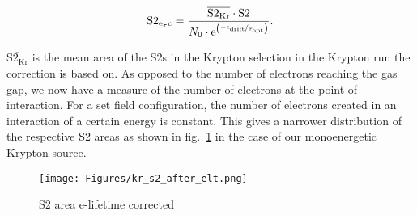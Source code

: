 \begin{equation}
    \mathrm{S2_\mathrm{e_\tau c}} = \frac{ \overline{\mathrm{S2_{Kr}}} \cdot \mathrm{S2} }{ N_0 \cdot \mathrm{e}^{ \left( \nicefrac{-t_\mathrm{drift}}{\tau_\mathrm{opt}} \right)} }.  %
\end{equation}

$ \overline{\mathrm{S2_{Kr}}} $ is the mean area of the S2s in the Krypton selection in the Krypton run the correction is based on.
As opposed to the number of electrons reaching the gas gap, we now have a measure of the number of electrons at the point of interaction.
For a set field configuration, the number of electrons created in an interaction of a certain energy is constant.
This gives a narrower distribution of the respective S2 areas as shown in fig.~\ref{fig:s2-area-hist-after-eltc} in the case of our monoenergetic Krypton source.


\begin{figure}
    \centering
    \texttt{[image: Figures/kr\_s2\_after\_elt.png]}  %
    \caption[S2 area e-lifetime corrected]{
        S2 area e-lifetime corrected
    }
    \label{fig:s2-area-hist-after-eltc}
\end{figure}


